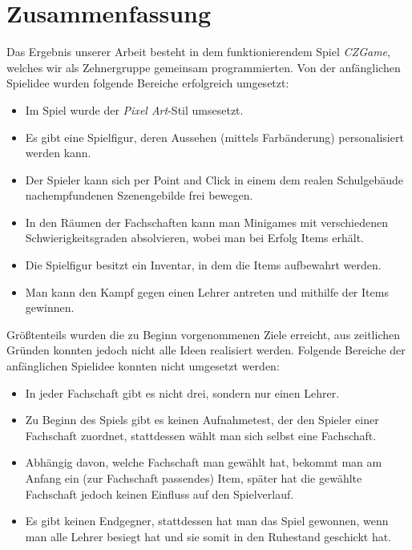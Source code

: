 \chapter{Zusammenfassung}

Das Ergebnis unserer Arbeit besteht in dem funktionierendem Spiel \emph{CZGame}, welches wir als Zehnergruppe gemeinsam programmierten. 
Von der anfänglichen Spielidee wurden folgende Bereiche erfolgreich umgesetzt:

\begin{itemize}
  \item Im Spiel wurde der \textit{Pixel Art}-Stil umsesetzt.
  \item Es gibt eine Spielfigur, deren Aussehen (mittels Farbänderung) personalisiert werden kann.
  \item Der Spieler kann sich per Point and Click in einem dem realen Schulgebäude nachempfundenen Szenengebilde frei bewegen.
  \item In den Räumen der Fachschaften kann man Minigames mit verschiedenen Schwierigkeitsgraden absolvieren, wobei man bei Erfolg Items erhält.
  \item Die Spielfigur besitzt ein Inventar, in dem die Items aufbewahrt werden.
  \item Man kann den Kampf gegen einen Lehrer antreten und mithilfe der Items gewinnen.
\end{itemize}

Größtenteils wurden die zu Beginn vorgenommenen Ziele erreicht, aus zeitlichen Gründen konnten jedoch nicht alle Ideen realisiert werden. 
Folgende Bereiche der anfänglichen Spielidee konnten nicht umgesetzt werden:

\begin{itemize}
  \item In jeder Fachschaft gibt es nicht drei, sondern nur einen Lehrer.
  \item Zu Beginn des Spiels gibt es keinen Aufnahmetest, der den Spieler einer Fachschaft zuordnet, stattdessen wählt man sich selbst eine Fachschaft.
  \item Abhängig davon, welche Fachschaft man gewählt hat, bekommt man am Anfang ein (zur Fachschaft passendes) Item, später hat die gewählte Fachschaft jedoch keinen Einfluss auf den Spielverlauf.
  \item Es gibt keinen Endgegner, stattdessen hat man das Spiel gewonnen, wenn man alle Lehrer besiegt hat und sie somit in den Ruhestand geschickt hat.
\end{itemize}

